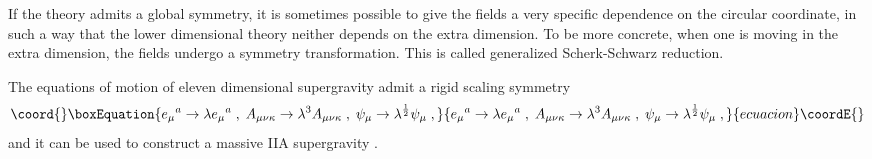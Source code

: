 \documentclass[a4paper,12pt]{article}
\begin{document}
If the theory admits a global symmetry, it is sometimes possible to give the fields a very specific dependence on the circular coordinate, in such a way that the lower dimensional theory neither depends on the extra dimension. To be more concrete, when one is moving in the extra dimension, the fields undergo a symmetry transformation. This is called generalized Scherk-Schwarz reduction.
  
The equations of motion of eleven dimensional supergravity \cite{Cremmer:1978km} admit a rigid scaling symmetry
\begin{equation}\coord{}\boxEquation{\label{scaling}
e_\mu{}^a \rightarrow \lambda e_\mu{}^a \; , \; A_{\mu \nu \kappa} \rightarrow \lambda^3 A_{\mu \nu \kappa}\; , \;
\psi_\mu \rightarrow \lambda^{\frac{1}{2}} \psi_\mu \; ,
}{e_\mu{}^a \rightarrow \lambda e_\mu{}^a \; , \; A_{\mu \nu \kappa} \rightarrow \lambda^3 A_{\mu \nu \kappa}\; , \;
\psi_\mu \rightarrow \lambda^{\frac{1}{2}} \psi_\mu \; ,
}{ecuacion}\coordE{}\end{equation}
and it can be used to construct a massive IIA supergravity \cite{Lavrinenko:1998qa}.
\end{document}
